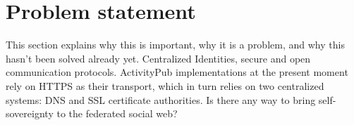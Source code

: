 




 
\section{Problem statement}
 
This section explains why this is important, why it is a problem, and why this hasn't been solved already yet. Centralized Identities, secure and open communication protocols. 
ActivityPub implementations at the present moment rely on HTTPS as their transport, which in turn relies on two centralized systems: DNS and SSL certificate authorities. Is there any way to bring self-sovereignty to the federated social web? \cite{webber_sporny_2017}
 

